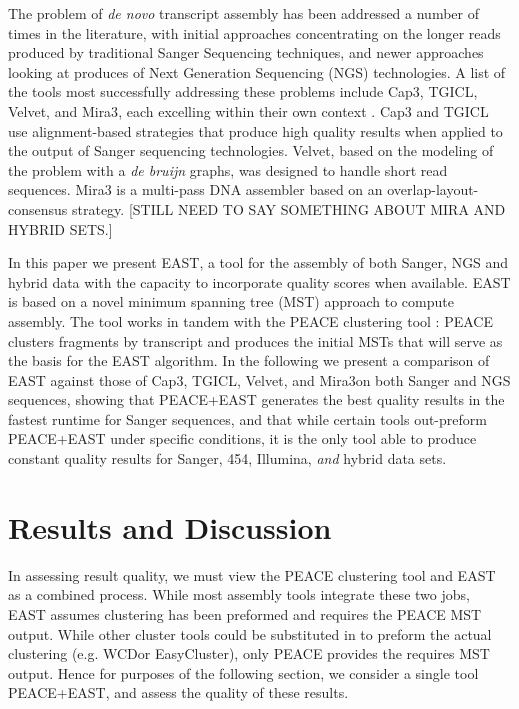 \documentclass[10pt]{bmc_article}
\newcommand{\peace} {{\small PEACE}}
\newcommand{\wcd} {{\small WCD}}
\newcommand{\capthree} {{\small Cap3}}
\newcommand{\easycluster} {{\small EasyCluster}}
\newcommand{\tgicl} {{\small TGICL}}
\newcommand{\east} {{\small EAST}}
\newcommand{\velvet}{{\small Velvet}}
\newcommand{\mira}{{\small Mira3}}
\newcommand{\peast}{{\small PEACE+EAST}}
\newenvironment{bmcformat}{\begin{raggedright}\baselineskip20pt\sloppy\setboolean{publ}{false}}{\end{raggedright}\baselineskip20pt\sloppy}
\begin{document}
\begin{bmcformat}
The problem of {\it de novo} transcript assembly has been addressed a
number of times in the literature, with initial approaches
concentrating on the longer reads produced by traditional Sanger
Sequencing techniques, and newer approaches looking at produces of
Next Generation Sequencing (NGS) technologies.  A list of the tools
most successfully addressing these problems include \capthree, \tgicl,
\velvet, and \mira, each excelling within their own context
\cite{Huang99,Pertea03,Chevreux04,Zerbino08}.  \capthree\/ and
\tgicl\/ use alignment-based strategies that produce high quality
results when applied to the output of Sanger sequencing technologies.
\velvet, based on the modeling of the problem with a {\it de bruijn}
graphs, was designed to handle short read sequences.  \mira\/ is a
multi-pass DNA assembler based on an overlap-layout-consensus
strategy.  [STILL NEED TO SAY SOMETHING ABOUT MIRA AND HYBRID SETS.]


In this paper we present \east, a tool for the assembly of both
Sanger, NGS and hybrid data with the capacity to incorporate quality
scores when available.  \east\/ is based on a novel minimum spanning
tree (MST) approach to compute assembly.  The tool works in tandem with
the \peace\/ clustering tool \cite{Rao10}: \peace\/ clusters
fragments by transcript and produces the initial MSTs that will serve
as the basis for the \east\/ algorithm.  In the following we present a
comparison of \east\/ against those of \capthree, \tgicl, \velvet, and
\mira on both Sanger and NGS sequences, showing that \peast\/
generates the best quality results in the fastest runtime for Sanger
sequences, and that while certain tools out-preform \peast\/ under specific
conditions, it is the only tool able to produce constant quality results
for Sanger, 454, Illumina, {\it and} hybrid data sets.



 
\section*{Results and Discussion}

In assessing result quality, we must view the \peace\/ clustering tool
\cite{Rao10} and \east\/ as a combined process.  While most assembly
tools integrate these two jobs, \east\/ assumes clustering has been
preformed and requires the \peace\/ MST output.  While other cluster
tools could be substituted in to preform the actual clustering
(e.g. \wcd or \easycluster \cite{Hazelhurst08,Picardi09}), only
\peace\/ provides the requires MST output.  Hence for purposes of the
following section, we consider a single tool \peast, and assess the
quality of these results.


\end{bmcformat}
\end{document}

